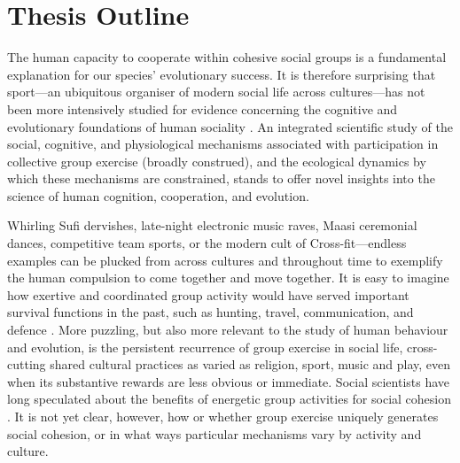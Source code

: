 \chapter{\label{introduction}Thesis Outline}

The human capacity to cooperate within cohesive social groups is a fundamental explanation for our species' evolutionary success.  It is therefore surprising that sport---an ubiquitous organiser of modern social life across cultures---has not been more intensively studied for evidence concerning the cognitive and evolutionary foundations of human sociality \citep{Blanchard1995,Downey2005a}.  An integrated scientific study of the social, cognitive, and physiological mechanisms associated with participation in collective group exercise (broadly construed), and the ecological dynamics by which these mechanisms are constrained, stands to offer novel insights into the science of human cognition, cooperation, and evolution.

Whirling Sufi dervishes, late-night electronic music raves, Maasi ceremonial dances, competitive team sports, or the modern cult of Cross-fit---endless examples can be plucked from across cultures and throughout time to exemplify the human compulsion to come together and move together.  It is easy to imagine how exertive and coordinated group activity would have served important survival functions in the past, such as hunting, travel, communication, and defence \citep{Sands2010}.  More puzzling, but also more relevant to the study of human behaviour and evolution, is the persistent recurrence of group exercise in social life, cross-cutting shared cultural practices as varied as religion, sport, music and play, even when its substantive rewards are less obvious or immediate.  Social scientists have long speculated about the benefits of energetic group activities for social cohesion \citep{Durkheim1965}. It is not yet clear, however, how or whether group exercise uniquely generates social cohesion, or in what ways particular mechanisms vary by activity and culture.

